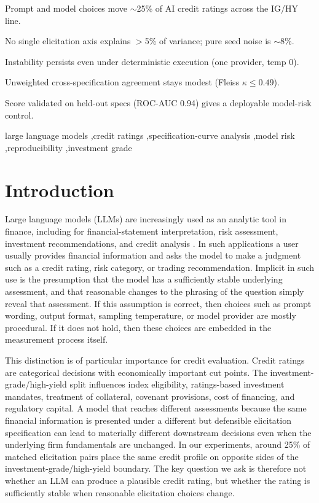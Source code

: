 \documentclass[a4paper,fleqn]{cas-sc}
\begin{document}
\begin{highlights}
\item Prompt and model choices move $\sim$25\% of AI credit ratings across the IG/HY line.
\item No single elicitation axis explains $>$5\% of variance; pure seed noise is $\sim$8\%.
\item Instability persists even under deterministic execution (one provider, temp 0).
\item Unweighted cross-specification agreement stays modest (Fleiss $\kappa\le0.49$).
\item Score validated on held-out specs (ROC-AUC 0.94) gives a deployable model-risk control.
\end{highlights}

\begin{keywords}
large language models \sep credit ratings \sep specification-curve analysis \sep model risk \sep reproducibility \sep investment grade
\end{keywords}

\maketitle

\section{Introduction}
Large language models (LLMs) are increasingly used as an analytic tool in finance, including for
financial-statement interpretation, risk assessment, investment recommendations, and credit analysis
\citep{hens2025risk}. In such applications a user usually provides financial information and asks
the model to make a judgment such as a credit rating, risk category, or trading recommendation. Implicit
in such use is the presumption that the model has a sufficiently stable underlying assessment, and that
reasonable changes to the phrasing of the question simply reveal that assessment. If this assumption is
correct, then choices such as prompt wording, output format, sampling temperature, or model provider are
mostly procedural. If it does not hold, then these choices are embedded in the measurement process
itself.

This distinction is of particular importance for credit evaluation. Credit ratings are categorical
decisions with economically important cut points. The investment-grade/high-yield split influences index
eligibility, ratings-based investment mandates, treatment of collateral, covenant provisions, cost of
financing, and regulatory capital. A model that reaches different assessments because the same financial
information is presented under a different but defensible elicitation specification can lead to materially
different downstream decisions even when the underlying firm fundamentals are unchanged. In our
experiments, around 25\% of matched elicitation pairs place the same credit profile on opposite sides of
the investment-grade/high-yield boundary. The key question we ask is therefore not whether an LLM can
produce a plausible credit rating, but whether the rating is sufficiently stable when reasonable
elicitation choices change.
\end{document}
